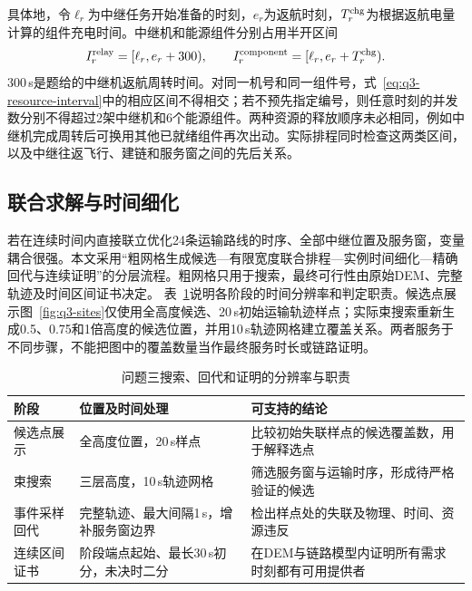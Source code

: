 具体地，令$\ell_r$为中继任务开始准备的时刻，$e_r$为返航时刻，$T^{\rm chg}_r$为根据返航电量计算的组件充电时间。中继机和能源组件分别占用半开区间
\begin{equation}
I_r^{\rm relay}=[\ell_r,e_r+300),\qquad
I_r^{\rm component}=[\ell_r,e_r+T^{\rm chg}_r).
\label{eq:q3-resource-interval}
\end{equation}
300\,s是题给的中继机返航周转时间。对同一机号和同一组件号，式~\eqref{eq:q3-resource-interval}中的相应区间不得相交；若不预先指定编号，则任意时刻的并发数分别不得超过2架中继机和6个能源组件。两种资源的释放顺序未必相同，例如中继机完成周转后可换用其他已就绪组件再次出动。实际排程同时检查这两类区间，以及中继往返飞行、建链和服务窗之间的先后关系。

\subsection{联合求解与时间细化}
若在连续时间内直接联立优化24条运输路线的时序、全部中继位置及服务窗，变量耦合很强。本文采用“粗网格生成候选—有限宽度联合排程—实例时间细化—精确回代与连续证明”的分层流程。粗网格只用于搜索，最终可行性由原始DEM、完整轨迹及时间区间证书决定。
表~\ref{tab:q3-fidelity}说明各阶段的时间分辨率和判定职责。候选点展示图~\ref{fig:q3-sites}仅使用全高度候选、20\,s初始运输轨迹样点；实际束搜索重新生成0.5、0.75和1倍高度的候选位置，并用10\,s轨迹网格建立覆盖关系。两者服务于不同步骤，不能把图中的覆盖数量当作最终服务时长或链路证明。
\begin{table}[htbp]
\centering\small
\caption{问题三搜索、回代和证明的分辨率与职责}
\label{tab:q3-fidelity}
\begin{tabular}{@{}p{}p{}p{}@{}}
\toprule
阶段 & 位置及时间处理 & 可支持的结论\\
\midrule
候选点展示 & 全高度位置，20\,s样点 & 比较初始失联样点的候选覆盖数，用于解释选点\\
束搜索 & 三层高度，10\,s轨迹网格 & 筛选服务窗与运输时序，形成待严格验证的候选\\
事件采样回代 & 完整轨迹、最大间隔1\,s，增补服务窗边界 & 检出样点处的失联及物理、时间、资源违反\\
连续区间证书 & 阶段端点起始、最长30\,s初分，未决时二分 & 在DEM与链路模型内证明所有需求时刻都有可用提供者\\
\bottomrule
\end{tabular}
\end{table}
